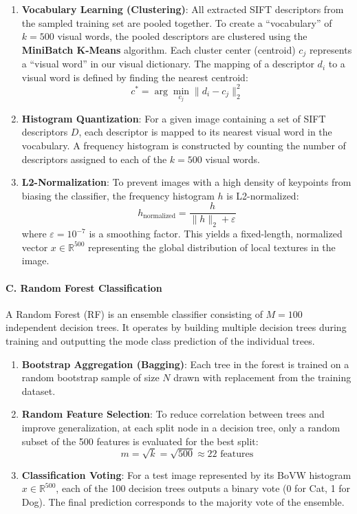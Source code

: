\documentclass[12pt,a4paper]{article}
\begin{document}
\begin{enumerate}
    \item \textbf{Vocabulary Learning (Clustering)}: All extracted SIFT descriptors from the sampled training set are pooled together. To create a ``vocabulary'' of $k = 500$ visual words, the pooled descriptors are clustered using the \textbf{MiniBatch K-Means} algorithm.
    Each cluster center (centroid) $c_j$ represents a ``visual word'' in our visual dictionary. The mapping of a descriptor $d_i$ to a visual word is defined by finding the nearest centroid:
    \begin{equation}
        c^* = \arg\min_{c_j} \|d_i - c_j\|_2^2
    \end{equation}
    \item \textbf{Histogram Quantization}: For a given image containing a set of SIFT descriptors $D$, each descriptor is mapped to its nearest visual word in the vocabulary. A frequency histogram is constructed by counting the number of descriptors assigned to each of the $k = 500$ visual words.
    \item \textbf{L2-Normalization}: To prevent images with a high density of keypoints from biasing the classifier, the frequency histogram $h$ is L2-normalized:
    \begin{equation}
        h_{\text{normalized}} = \frac{h}{\|h\|_2 + \varepsilon}
    \end{equation}
    where $\varepsilon = 10^{-7}$ is a smoothing factor. This yields a fixed-length, normalized vector $x \in \mathbb{R}^{500}$ representing the global distribution of local textures in the image.
\end{enumerate}

\paragraph{C. Random Forest Classification}
A Random Forest (RF) is an ensemble classifier consisting of $M = 100$ independent decision trees. It operates by building multiple decision trees during training and outputting the mode class prediction of the individual trees.

\begin{enumerate}
    \item \textbf{Bootstrap Aggregation (Bagging)}: Each tree in the forest is trained on a random bootstrap sample of size $N$ drawn with replacement from the training dataset.
    \item \textbf{Random Feature Selection}: To reduce correlation between trees and improve generalization, at each split node in a decision tree, only a random subset of the 500 features is evaluated for the best split:
    \begin{equation}
        m = \sqrt{k} = \sqrt{500} \approx 22\text{ features}
    \end{equation}
    \item \textbf{Classification Voting}: For a test image represented by its BoVW histogram $x \in \mathbb{R}^{500}$, each of the 100 decision trees outputs a binary vote (0 for Cat, 1 for Dog). The final prediction corresponds to the majority vote of the ensemble.
\end{enumerate}
\end{document}
